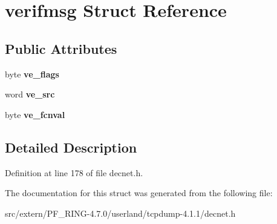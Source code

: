 \hypertarget{structverifmsg}{
\section{verifmsg Struct Reference}
\label{structverifmsg}
}
\subsection*{Public Attributes}
\begin{DoxyCompactItemize}
\item 
\hypertarget{structverifmsg_a8bd2e81a0ac3c1c071463e29600b6f9e}{
byte {\bfseries ve\_\-flags}}
\label{structverifmsg_a8bd2e81a0ac3c1c071463e29600b6f9e}

\item 
\hypertarget{structverifmsg_a5c9cd863ac23df888df354426382f35b}{
word {\bfseries ve\_\-src}}
\label{structverifmsg_a5c9cd863ac23df888df354426382f35b}

\item 
\hypertarget{structverifmsg_aa7a94c5b9926a24262dbb981df8e66e2}{
byte {\bfseries ve\_\-fcnval}}
\label{structverifmsg_aa7a94c5b9926a24262dbb981df8e66e2}

\end{DoxyCompactItemize}


\subsection{Detailed Description}


Definition at line 178 of file decnet.h.



The documentation for this struct was generated from the following file:\begin{DoxyCompactItemize}
\item 
src/extern/PF\_\-RING-\/4.7.0/userland/tcpdump-\/4.1.1/decnet.h\end{DoxyCompactItemize}
